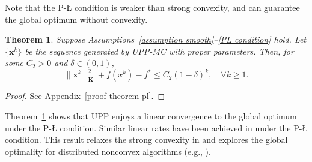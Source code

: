 \documentclass[12pt,draftcls,onecolumn]{IEEEtran}
\newtheorem{theorem}{Theorem}
\begin{document}
Note that the P-{\L} condition is weaker than strong convexity, and can guarantee the global optimum without convexity. 

\begin{theorem}\label{theorem pl}
	Suppose Assumptions~\ref{assumption smooth}--\ref{PL condition} hold. Let $\{\mathbf{x}^k\}$ be the sequence generated by UPP-MC with proper parameters. Then, for some $C_2>0$ and $\delta\in(0,1)$,
	\begin{equation}
		\|\mathbf{x}^k\|^2_{\mathbf{K}} + f(\bar{x}^k) - f^* \leq C_2(1-\delta)^{k}, \quad \forall k \geq 1.
		\label{theorem 2 linear}
	\end{equation}
\end{theorem}
\begin{proof}
	See Appendix~\ref{proof theorem pl}.
\end{proof}

Theorem~\ref{theorem pl} shows that UPP enjoys a linear convergence to the global optimum under the P-{\L} condition. Similar linear rates have been achieved in \cite{yi2022sublinear,yi2021linear,alghunaim_unified_2022} under the P-{\L} condition. This result relaxes the strong convexity in \cite{shi_extra_2015,nedic_achieving_2017,xu_bregman_2018} and explores the global optimality for distributed nonconvex algorithms (e.g., \cite{alghunaim_unified_2022,hong_prox-pda_2017,sun2018distributed}).

\end{document}

